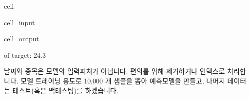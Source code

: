 \documentclass[letterpaper,10pt,english]{jupyterBook}
\begin{document}
\begin{sphinxuseclass}{cell}\begin{sphinxVerbatimInput}

\begin{sphinxuseclass}{cell_input}
\begin{sphinxVerbatim}[commandchars=\\\{\}]
   
\PYG{p}{[}\PYG{p}{]}  \PYG{p}{[}\PYG{p}{]}   
  \PYG{p}{[}\PYG{p}{]}
\end{sphinxVerbatim}

\end{sphinxuseclass}\end{sphinxVerbatimInput}
\begin{sphinxVerbatimOutput}

\begin{sphinxuseclass}{cell_output}
\begin{sphinxVerbatim}[commandchars=\\\{\}]
\PYGZpc{} of target: 24.3\PYGZpc{}
\end{sphinxVerbatim}

\end{sphinxuseclass}\end{sphinxVerbatimOutput}

\end{sphinxuseclass}
\sphinxAtStartPar
 날짜와 종목은 모델의 입력피처가 아닙니다. 편의를 위해 제거하거나 인덱스로 처리합니다. 모델 트레이닝 용도로 10,000 개 샘플을 뽑아 예측모델을 만들고, 나머지 데이터는 테스트(혹은 백테스팅)를 하겠습니다.
\end{document}
